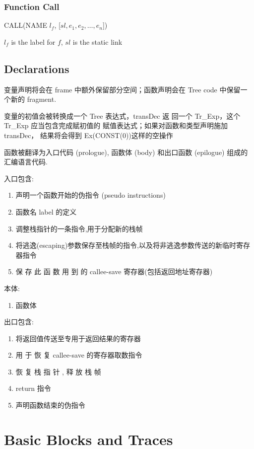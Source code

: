 \subsubsection{Function Call}
CALL(NAME $l_f$, [$sl, e_1, e_2,\dots, e_n$])

$l_f$ is the label for $f$, $sl$ is the static link

\subsection{Declarations}
变量声明将会在 frame 中额外保留部分空间；函数声明会在 Tree code 中保留一个新的 fragment.

变量的初值会被转换成一个 Tree 表达式，transDec 返
回一个 Tr\_Exp，这个 Tr\_Exp 应当包含完成赋初值的
赋值表达式；如果对函数和类型声明施加 transDec，
结果将会得到 Ex(CONST(0))这样的空操作

函数被翻译为入口代码 (prologue), 函数体 (body) 和出口函数 (epilogue) 组成的汇编语言代码.

入口包含:
\begin{enumerate}
    \item 声明一个函数开始的伪指令 (pseudo instructions)
    \item 函数名 label 的定义
    \item 调整栈指针的一条指令,用于分配新的栈帧
    \item 将逃逸(escaping)参数保存至栈帧的指令,以及将非逃逸参数传送的新临时寄存器指令
    \item 保 存  此 函 数 用 到 的 callee-save 寄存器(包括返回地址寄存器)
\end{enumerate}

本体:
\begin{enumerate}[start=6]
    \item 函数体
\end{enumerate}

出口包含:
\begin{enumerate}[start=7]
    \item 将返回值传送至专用于返回结果的寄存器 
    \item 用 于 恢 复 callee-save 的寄存器取数指令
    \item 恢 复 栈 指 针 , 释 放 栈 帧
    \item return 指令
    \item 声明函数结束的伪指令
\end{enumerate}


\section{Basic Blocks and Traces}

